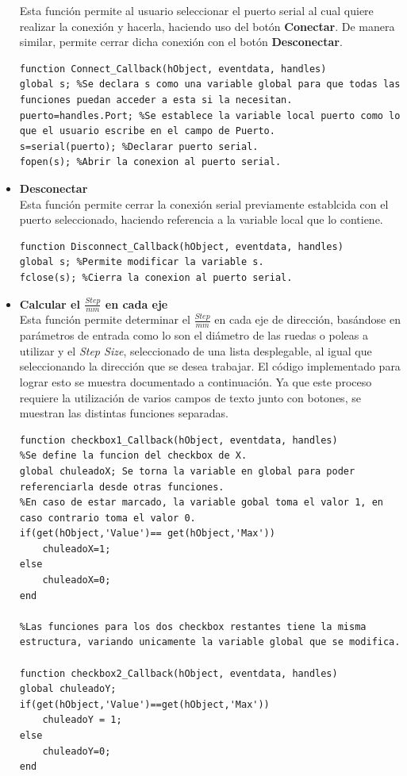 \documentclass{article}
\begin{document}
\begin{multicols}{2}
\begin{itemize}
Esta función permite al usuario seleccionar el puerto serial al cual quiere realizar la conexión y hacerla, haciendo uso del botón \textbf{Conectar}. De manera similar, permite cerrar dicha conexión con el botón \textbf{Desconectar}.
\begin{lstlisting}
function Connect_Callback(hObject, eventdata, handles)
global s; %Se declara s como una variable global para que todas las funciones puedan acceder a esta si la necesitan.
puerto=handles.Port; %Se establece la variable local puerto como lo que el usuario escribe en el campo de Puerto.
s=serial(puerto); %Declarar puerto serial.
fopen(s); %Abrir la conexion al puerto serial.
\end{lstlisting}
\item \textbf{Desconectar}\\
Esta función permite cerrar la conexión serial previamente establcida con el puerto seleccionado, haciendo referencia a la variable local que lo contiene.
\begin{lstlisting}
function Disconnect_Callback(hObject, eventdata, handles)
global s; %Permite modificar la variable s.
fclose(s); %Cierra la conexion al puerto serial.
\end{lstlisting}
\item \textbf{Calcular el $\frac{Step}{mm}$ en cada eje}\\
Esta función permite determinar el $\frac{Step}{mm}$ en cada eje de dirección, basándose en parámetros de entrada como lo son el diámetro de las ruedas o poleas a utilizar y el \textit{Step Size}, seleccionado de una lista desplegable, al igual que seleccionando la dirección que se desea trabajar. El código implementado para lograr esto se muestra documentado a continuación. Ya que este proceso requiere la utilización de varios campos de texto junto con botones, se muestran las distintas funciones separadas.
\begin{lstlisting}
function checkbox1_Callback(hObject, eventdata, handles)
%Se define la funcion del checkbox de X.
global chuleadoX; Se torna la variable en global para poder referenciarla desde otras funciones.
%En caso de estar marcado, la variable gobal toma el valor 1, en caso contrario toma el valor 0.
if(get(hObject,'Value')== get(hObject,'Max'))
    chuleadoX=1;
else
    chuleadoX=0;
end

%Las funciones para los dos checkbox restantes tiene la misma estructura, variando unicamente la variable global que se modifica.

function checkbox2_Callback(hObject, eventdata, handles)
global chuleadoY;
if(get(hObject,'Value')==get(hObject,'Max'))
    chuleadoY = 1;
else
    chuleadoY=0;
end


\end{lstlisting}
\end{itemize}
\end{multicols}
\end{document}

